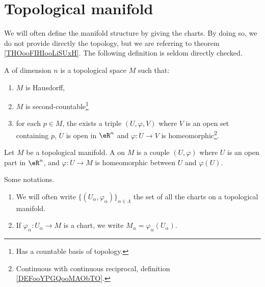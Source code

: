 

\section{Topological manifold}

We will often define the manifold structure by giving the charts. By doing so, we do not provide directly the topology, but we are referring to theorem \ref{THOooFIHIooLiSUxH}. The following definition is seldom directly checked.
\begin{definition}				\label{DEFooJOMAooZscKwn}
	A  of dimension \( n\) is a topological space \( M\) such that:
	\begin{enumerate}
		\item		\label{ITEMooZZXHooPICcjz}
		      \( M\) is Hausdorff,
		\item		\label{ITEMooKOSMooSawqbB}
		      \( M\) is second-countable\footnote{Has a countable basis of topology.}
		\item		\label{ITEMooJOPDooPiOadZ}
		      for each \( p\in M\), the exists a triple \( (U,\varphi,V)\) where \( V\) is an open set containing \( p\), \( U\) is open in \( \eR^n\) and \(\varphi \colon U\to V  \) is homeomorphic\footnote{Continuous with continuous reciprocal, definition \ref{DEFooYPGQooMAObTO}.}.
	\end{enumerate}
\end{definition}

\begin{definition}		\label{DEFooKUJWooXHoCFI}
	Let \( M\) be a topological manifold. A  on \( M\) is a couple \( (U,\varphi)\) where \( U\) is an open part in \( \eR^n\), and \(\varphi \colon U\to M \) is homeomorphic between \( U\) and \( \varphi(U)\).
\end{definition}

\begin{normaltext}
	Some notations.
	\begin{enumerate}
		\item
		      We will often write \( \{ (U_{\alpha}, \varphi_{\alpha})\}_{\alpha\in \Lambda}\) the set of all the charts on a topological manifold.
		\item
		      If \(\varphi_{\alpha} \colon U_{\alpha}\to M  \) is a chart, we write \( M_{\alpha}=\varphi_{\alpha}(U_{\alpha})\).
	\end{enumerate}
\end{normaltext}

